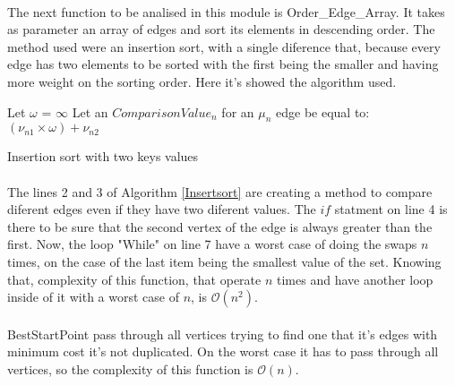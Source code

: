 \documentclass[titlepage]{article}
\begin{document}
        \paragraph{}
        The next function to be analised in this module is Order\_Edge\_Array. It takes as parameter an array of edges and sort its elements in descending order. The method used were an insertion sort, with a single diference that, because every edge has two elements to be sorted with the first being the smaller and having more weight on the sorting order. Here it's showed the algorithm used.
        \begin{algorithm}[h]
            Let $\omega$ = $\infty$\;
            Let an $ComparisonValue_n$ for an $\mu_n$ edge be equal to:
            $(\nu_{n1} \times \omega) + \nu_{n2}$\;
            \SetAlgoLined
            \caption{Insertion sort with two keys values\label{Insertsort}}
        \end{algorithm}
    \paragraph{}
    The lines 2 and 3 of Algorithm \ref{Insertsort} are creating a method to compare diferent edges even if they have two diferent values. The $if$ statment on line 4 is there to be sure that the second vertex of the edge is always greater than the first. Now, the loop "While" on line 7 have a worst case of doing the swaps $n$ times, on the case of the last item being the smallest value of the set. Knowing that, complexity of this function, that operate $n$ times and have another loop inside of it with a worst case of $n$, is $\mathcal{O}(n^2)$.
    \paragraph{}
    BestStartPoint pass through all vertices trying to find one that it's edges with minimum cost it's not duplicated. On the worst case it has to pass through all vertices, so the complexity of this function is $\mathcal{O}(n)$.
\end{document}
